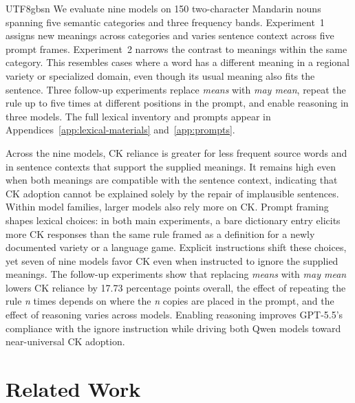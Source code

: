 \documentclass[11pt]{article}
\begin{document}
\begin{CJK*}{UTF8}{gbsn}
We evaluate nine models on 150 two-character Mandarin nouns spanning five semantic categories and three frequency bands. Experiment~1 assigns new meanings across categories and varies sentence context across five prompt frames. Experiment~2 narrows the contrast to meanings within the same category. This resembles cases where a word has a different meaning in a regional variety or specialized domain, even though its usual meaning also fits the sentence. 
Three follow-up experiments replace \emph{means} with \emph{may mean}, repeat the rule up to five times at different positions in the prompt, and enable reasoning in three models. The full lexical inventory and prompts appear in Appendices~\ref{app:lexical-materials} and~\ref{app:prompts}.

Across the nine models, CK reliance is greater for less frequent source words and in sentence contexts that support the supplied meanings. It remains high even when both meanings are compatible with the sentence context, indicating that CK adoption cannot be explained solely by the repair of implausible sentences. Within
model families, larger models also rely more on CK.
Prompt framing shapes lexical choices: in both main experiments, a bare dictionary entry elicits more CK responses than the same rule framed as a definition for a newly documented variety or a language game. Explicit instructions shift these choices, yet seven of nine models favor CK even when instructed to ignore the supplied meanings. The follow-up experiments show that replacing \emph{means} with \emph{may mean} lowers CK reliance by 17.73 percentage points overall, the effect of repeating the rule \textit{n} times depends on where the \textit{n} copies are placed in the prompt, and the effect of reasoning varies across models. Enabling reasoning improves GPT-5.5’s compliance with the ignore instruction while driving both Qwen models toward near-universal CK adoption.

\section{Related Work}
\label{sec:related-work}


\end{CJK*}
\end{document}

